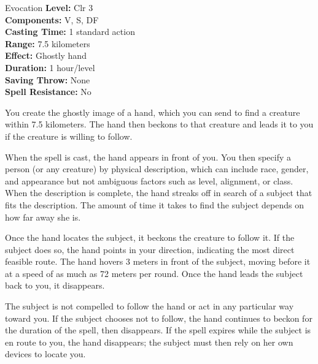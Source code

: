 {Evocation}
{
	\textbf{Level:}
	Clr 3\\
	\textbf{Components:}
	V, S, DF\\
	\textbf{Casting Time:}
	1 standard action\\
	\textbf{Range:}
	7.5 kilometers\\
	\textbf{Effect:}
	Ghostly hand\\
	\textbf{Duration:}
	1 hour/level\\
	\textbf{Saving Throw:}
	None\\
	\textbf{Spell Resistance:}
	No\\
}
{
	You create the ghostly image of a hand, which you can send to find a creature within 7.5 kilometers. The hand then beckons to that creature and leads it to you if the creature is willing to follow.


	When the spell is cast, the hand appears in front of you. You then specify a person (or any creature) by physical description, which can include race, gender, and appearance but not ambiguous factors such as level, alignment, or class. When the description is complete, the hand streaks off in search of a subject that fits the description. The amount of time it takes to find the subject depends on how far away she is.

	Once the hand locates the subject, it beckons the creature to follow it. If the subject does so, the hand points in your direction, indicating the most direct feasible route. The hand hovers 3 meters in front of the subject, moving before it at a speed of as much as 72 meters per round. Once the hand leads the subject back to you, it disappears.

	The subject is not compelled to follow the hand or act in any particular way toward you. If the subject chooses not to follow, the hand continues to beckon for the duration of the spell, then disappears. If the spell expires while the subject is en route to you, the hand disappears; the subject must then rely on her own devices to locate you.

}
